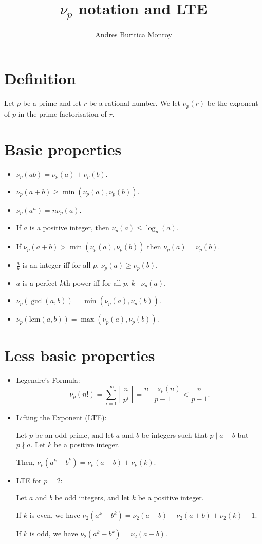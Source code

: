 \documentclass{article}
\title{$\nu_p$ notation and LTE}
\author{Andres Buritica Monroy}
\date{}
\newcommand\lcm{\mathrm{lcm}}
\begin{document}
\maketitle
\section{Definition}
  Let $p$ be a prime and let $r$ be a rational number. We let $\nu_p(r)$ be the
  exponent of $p$ in the prime factorisation of $r$.
\section{Basic properties}
\begin{itemize}
  \item $\nu_p(ab)=\nu_p(a)+\nu_p(b)$.
  \item $\nu_p(a+b)\ge\min(\nu_p(a),\nu_p(b))$.
  \item $\nu_p(a^n)=n\nu_p(a)$.
  \item If $a$ is a positive integer, then $\nu_p(a)\le\log_p(a)$.
  \item If $\nu_p(a+b)>\min(\nu_p(a),\nu_p(b))$ then $\nu_p(a)=\nu_p(b)$.
  \item $\frac ab$ is an integer iff for all $p$, $\nu_p(a)\ge\nu_p(b)$.
  \item $a$ is a perfect $k$th power iff for all $p$, $k\mid\nu_p(a)$.
  \item $\nu_p(\gcd(a,b))=\min(\nu_p(a),\nu_p(b))$.
  \item $\nu_p(\lcm(a,b))=\max(\nu_p(a),\nu_p(b))$.
\end{itemize}
\section{Less basic properties}
\begin{itemize}
  \item Legendre's Formula:
    \[\nu_p(n!)=\sum_{i=1}^\infty\left\lfloor\frac
      n{p^i}\right\rfloor=\frac{n-s_p(n)}{p-1}<\frac
    n{p-1}.\]
  \item Lifting the Exponent (LTE):

    Let $p$ be an odd prime, and let $a$ and $b$ be integers such that $p\mid
    a-b$ but $p\nmid a$. Let $k$ be a positive integer.

    Then, $\nu_p\left(a^k-b^k\right)=\nu_p(a-b)+\nu_p(k)$.
  \item LTE for $p=2$:

    Let $a$ and $b$ be odd integers, and let $k$ be a positive integer.

    If $k$ is even, we have $\nu_2(a^k-b^k)=\nu_2(a-b)+\nu_2(a+b)+\nu_2(k)-1$.

    If $k$ is odd, we have $\nu_2(a^k-b^k)=\nu_2(a-b)$.
\end{itemize}
\end{document}
